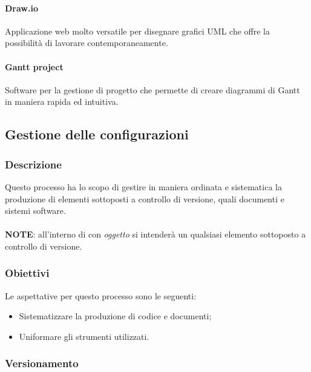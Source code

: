 \paragraph{Draw.io}
\label{par:drawio}

Applicazione web molto versatile per disegnare grafici UML che offre la possibilità di lavorare contemporaneamente.

\paragraph{Gantt project}
\label{par:gantt_projecct}

Software per la gestione di progetto che permette di creare diagrammi di Gantt in maniera rapida ed intuitiva.


\subsection{Gestione delle configurazioni}
\label{sub:gestione_configurazioni}

\subsubsection{Descrizione}
\label{ssub:gestione_configurazione:descrizione}

Questo processo ha lo scopo di gestire in maniera ordinata e sistematica la produzione di elementi sottoposti a controllo di versione, 
quali documenti e sistemi software.
\\
\\
\textbf{NOTE}: all'interno di  con \emph{oggetto} si intenderà un qualsiasi elemento sottoposto a 
controllo di versione.

\subsubsection{Obiettivi}
\label{ssub:gestione_configurazione:obiettivi}

Le aspettative per questo processo sono le seguenti:
\begin{itemize}
    \item Sistematizzare la produzione di codice e documenti;
    \item Uniformare gli strumenti utilizzati.
\end{itemize}

\subsubsection{Versionamento}
\label{ssub:gestione_configurazione:versionamento}

